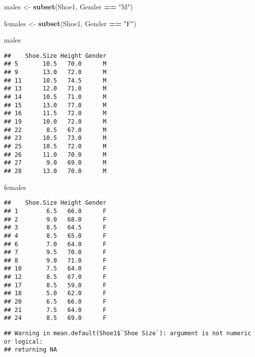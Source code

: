 \documentclass[
]{article}
\newenvironment{Shaded}{\begin{snugshade}}{\end{snugshade}}
\newcommand{\AttributeTok}[1]{\textcolor[rgb]{0.13,0.29,0.53}{#1}}
\newcommand{\FunctionTok}[1]{\textcolor[rgb]{0.13,0.29,0.53}{\textbf{#1}}}
\newcommand{\NormalTok}[1]{#1}
\newcommand{\OtherTok}[1]{\textcolor[rgb]{0.56,0.35,0.01}{#1}}
\newcommand{\SpecialCharTok}[1]{\textcolor[rgb]{0.81,0.36,0.00}{\textbf{#1}}}
\newcommand{\StringTok}[1]{\textcolor[rgb]{0.31,0.60,0.02}{#1}}
\begin{document}
\begin{Shaded}
\begin{Highlighting}[]
\NormalTok{males }\OtherTok{\textless{}{-}} \FunctionTok{subset}\NormalTok{(Shoe1, Gender }\SpecialCharTok{==} \StringTok{"M"}\NormalTok{)}

\NormalTok{females }\OtherTok{\textless{}{-}} \FunctionTok{subset}\NormalTok{(Shoe1, Gender }\SpecialCharTok{==} \StringTok{"F"}\NormalTok{)}

\NormalTok{males}
\end{Highlighting}
\end{Shaded}

\begin{verbatim}
##    Shoe.Size Height Gender
## 5       10.5   70.0      M
## 9       13.0   72.0      M
## 11      10.5   74.5      M
## 13      12.0   71.0      M
## 14      10.5   71.0      M
## 15      13.0   77.0      M
## 16      11.5   72.0      M
## 19      10.0   72.0      M
## 22       8.5   67.0      M
## 23      10.5   73.0      M
## 25      10.5   72.0      M
## 26      11.0   70.0      M
## 27       9.0   69.0      M
## 28      13.0   70.0      M
\end{verbatim}

\begin{Shaded}
\begin{Highlighting}[]
\NormalTok{females}
\end{Highlighting}
\end{Shaded}

\begin{verbatim}
##    Shoe.Size Height Gender
## 1        6.5   66.0      F
## 2        9.0   68.0      F
## 3        8.5   64.5      F
## 4        8.5   65.0      F
## 6        7.0   64.0      F
## 7        9.5   70.0      F
## 8        9.0   71.0      F
## 10       7.5   64.0      F
## 12       8.5   67.0      F
## 17       8.5   59.0      F
## 18       5.0   62.0      F
## 20       6.5   66.0      F
## 21       7.5   64.0      F
## 24       8.5   69.0      F
\end{verbatim}

\begin{Shaded}
\end{Shaded}

\begin{verbatim}
## Warning in mean.default(Shoe1$`Shoe Size`): argument is not numeric or logical:
## returning NA
\end{verbatim}
\end{document}
